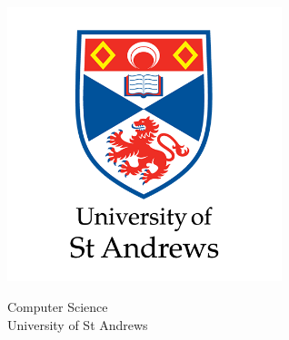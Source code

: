 \begin{titlepage}
    \begin{center}
    \begin{Large}
        \vspace*{1cm}

        \makeatletter
        \textbf{\Huge \@title}

        \vspace{0.5cm}
        \subtitle
            
        \vspace{1.5cm}

        \textbf{\large \@author}

        \vspace{0pt plus 0.75fill}
       
        \includegraphics[width=0.6\textwidth]{Template/university-of-st-andrews-logo.png}
        
        \vfill
       
        Computer Science\\
        University of St Andrews\\
        \@date
            
    \end{Large}
    \end{center}
\end{titlepage}